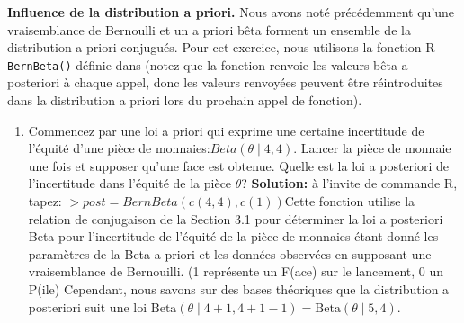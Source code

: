 \begin{Exemple}\textbf{Influence de la distribution a priori.}  Nous avons noté précédemment qu'une vraisemblance de Bernoulli et un a priori bêta forment un ensemble de la distribution a priori conjugués. Pour cet exercice, nous utilisons la fonction R \texttt{BernBeta()} définie dans \cite{BDA_K} (notez que la fonction renvoie les valeurs bêta a posteriori à chaque appel, donc les valeurs renvoyées peuvent être réintroduites dans la distribution a priori lors du prochain appel de fonction).
\begin{enumerate}[label=(\alph*)]
	\item Commencez par une loi a priori qui exprime une certaine incertitude de l'équité d'une pièce de monnaies:$Beta(\theta\mid 4,4)$. Lancer la pièce de monnaie une fois et supposer qu'une face est obtenue.
Quelle est la loi a posteriori de l'incertitude dans l'équité de la pièce $\theta$? \newl 
	\textbf{Solution:} à l'invite de commande R, tapez: \newl \small \texttt{$> post = BernBeta(c(4,4) , c(1))$}\normalsize\newl Cette fonction utilise la relation de conjugaison de la Section 3.1 pour déterminer la loi a posteriori Beta pour l'incertitude de l'équité de la pièce de monnaies étant donné les paramètres de la Beta a priori et les données observées en supposant une vraisemblance de Bernouilli. (1 représente un F(ace) sur le lancement, 0 un P(ile) Cependant, nous savons sur des bases théoriques que la distribution a posteriori suit une loi  $\text{Beta}(\theta \mid  4+1,4+1-1)=\text{Beta}(\theta\mid  5,4)$.
	\begin{center}

\end{center}
\end{enumerate}
\end{Exemple}
